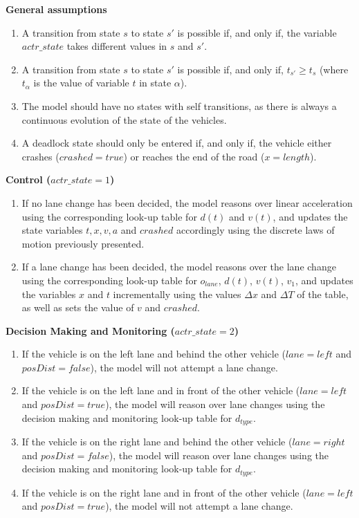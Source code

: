 \textbf{General assumptions}

\begin{enumerate}
	\item A transition from state $s$ to state $s'$ is possible if, and only if, the variable $actr\_state$ takes different values in $s$ and $s'$.
	\item A transition from state $s$ to state $s'$ is possible if, and only if, $t_{s'} \geq t_s$ (where $t_{\alpha}$ is the value of variable $t$ in state $\alpha$).
	\item The model should have no states with self transitions, as there is always a continuous evolution of the state of the vehicles.
	\item A deadlock state should only be entered if, and only if, the vehicle either crashes ($crashed = true$) or reaches the end of the road ($x = length$).
\end{enumerate}

\textbf{Control ($actr\_state = 1$)}

\begin{enumerate}
	\item If no lane change has been decided, the model reasons over linear acceleration using the corresponding look-up table for $d(t)$ and $v(t)$, and updates the state variables $t, x, v, a$ and $crashed$ accordingly using the discrete laws of motion previously presented.
	\item If a lane change has been decided, the model reasons over the lane change using the corresponding look-up table for $o_{lane}$, $d(t)$, $v(t)$, $v_1$, and updates the variables $x$ and $t$ incrementally using the values $\Delta x$ and $\Delta T$ of the table, as well as sets the value of $v$ and $crashed$.
\end{enumerate}

\textbf{Decision Making and Monitoring ($actr\_state = 2$)}

\begin{enumerate}
	\item If the vehicle is on the left lane and behind the other vehicle ($lane=left$ and $posDist = false$), the model will not attempt a lane change.
	\item If the vehicle is on the left lane and in front of the other vehicle ($lane=left$ and $posDist = true$), the model will reason over lane changes using the decision making and monitoring look-up table for $d_{type}$.
	\item If the vehicle is on the right lane and behind the other vehicle ($lane=right$ and $posDist = false$), the model will reason over lane changes using the decision making and monitoring look-up table for $d_{type}$.
	\item If the vehicle is on the right lane and in front of the other vehicle ($lane=left$ and $posDist = true$), the model will not attempt a lane change.
\end{enumerate}

